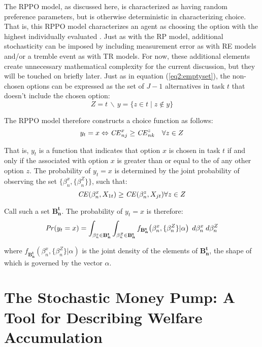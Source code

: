 \documentclass[../main.tex]{subfiles}
\begin{document}
The RPPO model, as discussed here, is characterized as having random preference parameters, but is otherwise deterministic in characterizing choice.
That is, this RPPO model characterizes an agent as choosing the option with the highest individually evaluated {\CE}.
Just as with the RP model, additional stochasticity can be imposed by including measurement error as with RE models and/or a tremble event as with TR models.
For now, these additional elements create unnecessary mathematical complexity for the current discussion, but they will be touched on briefly later.
Just as in equation (\ref{eq2:emptyset}), the non-chosen options can be expressed as the set of $J-1$ alternatives in task $t$ that doesn't include the chosen option:
\begin{equation}
	\label{eq2:RPPO:emptyset}
	Z = t \,\backslash\, y = \{z \in t \;|\; z \notin y \}
\end{equation}


\noindent The RPPO model therefore constructs a choice function as follows:
\begin{equation}
	\label{RPPO.y0}
	y_t = x \Leftrightarrow {\ensuremath{\mathit{CE}}}_{nj}^x \geq {\ensuremath{\mathit{CE}}}_{nk}^z \quad \forall z \in Z
\end{equation}

That is, $y_t$ is a function that indicates that option $x$ is chosen in task $t$ if and only if the {\CE} associated with option $x$ is greater than or equal to the {\CE} of any other option $z$.
The probability of $y_t = x$ is determined by the joint probability of observing the set $\bigl\{\beta_n^x,\{\beta_n^Z\}\bigr\}$, such that:
\begin{equation}
	\label{eq2:RPPO.y1}
	{\ensuremath{\mathit{CE}}}(\beta_n^x,X_{1t}) \geq {\ensuremath{\mathit{CE}}}(\beta_n^z,X_{jt}) \forall z \in Z
\end{equation}

\noindent Call such a set $\mathbf{B^t_n}$.
The probability of $y_t=x$ is therefore:
\begin{equation}
	{\ensuremath{\mathit{Pr}}}(y_t=x) = \int_{\beta_n^x \in \mathbf{B^t_n}}\int_{\beta_n^Z \in \mathbf{B^t_n}} f_{\mathbf{B^t_n}}\!\left(\beta_n^x,\{\beta_n^Z\}|\alpha\right) \;d\beta_n^x \; d\beta_n^Z
\end{equation}

\noindent where $f_{\mathbf{B^t_n}}(\beta_n^x,\{\beta_n^Z\}|\alpha)$ is the joint density of the elements of $\mathbf{B^t_n}$, the shape of which is governed by the vector $\alpha$.

\section[The Stochastic Money Pump: A Tool for Describing Welfare \texorpdfstring{\\}{}Accumulation]{The Stochastic Money Pump: A Tool for Describing Welfare\\Accumulation}
\end{document}
